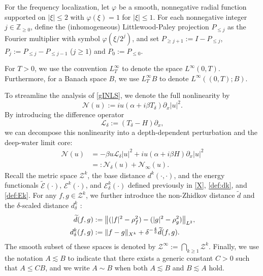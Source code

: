 \documentclass{amsart}
\numberwithin{equation}{section}
\newcommand{\Z}{\mathbb{Z}}
\newcommand{\Td}{T_{\delta}}
\begin{document}
For the frequency localization, let $\varphi$ be a smooth, nonnegative radial function supported on $|\xi| \leq 2$ with $\varphi(\xi) = 1$ for $|\xi| \leq 1$. 
For each nonnegative integer $j\in \Z_{\geq 0}$, define the (inhomogeneous) Littlewood-Paley projection $P_{\leq j}$ as the Fourier multiplier with symbol $\varphi(\xi/2^j)$, and set $P_{\geq j+1} := I - P_{\leq j}$, $P_j:=P_{\leq j}-P_{\leq j-1}$ ($j\geq 1$) and $P_0:=P_{\leq 0}$.

For $T>0$, we use the convention $L_{T}^{\infty}$ to denote the space $L^{\infty}(0,T)$. 
Furthermore, for a Banach space $B$, we use $L^{\infty}_{T}B$ to denote $L^{\infty}((0,T) ;B)$.

To streamline the analysis of \eqref{gINLS}, we denote the full nonlinearity by
$$ 
    \mathcal{N}(u):=iu(\alpha +i\beta \Td)\partial_x|u|^2.
$$
By introducing the difference operator $$\mathcal{L}_\delta:=(\Td -H)\partial_x,$$ we can decompose this nonlinearity into a depth-dependent perturbation and the deep-water limit core:
\begin{equation} \label{def:N0N1}\begin{aligned}
\mathcal{N}(u)
&=-\beta u\mathcal{L}_\delta |u|^2 +iu(\alpha +i\beta H)\partial_x|u|^2 \\
&=: \mathcal{N}_\delta(u)+\mathcal{N}_\infty(u) .
\end{aligned}
\end{equation}
Recall the metric space $\mathcal{Z}^k$, the base distance $d^k(\cdot,\cdot)$, and the energy functionals $\widetilde{\mathcal{E}}(\cdot)$, $\mathcal{E}^k(\cdot)$, and $\mathcal{E}^k_\delta(\cdot)$ defined previously in \eqref{X}, \eqref{def:dk}, and \eqref{def:Ek}. For any $f,g\in \mathcal{Z}^k$, we further introduce the non-Zhidkov distance $\widetilde{d}$ and the $\delta$-scaled distance $d^k_\delta$ :
\begin{align}\label{def:d1}
\widetilde{d}(f,g)
&:=\big\| (|f|^2-\rho_f^2)-(|g|^2-\rho_g^2)\big\|_{L^2},\\
d^k_\delta(f,g)&:=\| f-g\|_{X^k}+\delta^{-\frac{4}{3}}\widetilde{d}(f,g).\notag
\end{align}
The smooth subset of these spaces is denoted by $\mathcal{Z}^\infty:=\bigcap_{k\geq 1}\mathcal{Z}^k$. Finally, we use the notation $A \lesssim B$ to indicate that there exists a generic constant $C > 0$ such that $A \leq CB$, and we write $A \sim B$ when both $A \lesssim B$ and $B \lesssim A$ hold.


\end{document}
